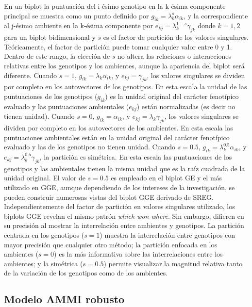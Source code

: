 En un biplot la puntuación del i-ésimo genotipo en la k-ésima componente principal se muestra como un punto definido por $g_{ik} = \lambda_k^{s} \alpha_{ik}$, y la correspondiente al j-ésimo ambiente en la k-ésima componente por $e_{kj} = \lambda_k^{1-s} \gamma_{jk}$ donde $k=1,2$ para un biplot bidimensional y $s$ es el factor de partición de los valores singulares. Teóricamente, el factor de partición puede tomar cualquier valor entre 0 y 1. Dentro de este rango, la elección de $s$ no altera las relaciones o interacciones relativas entre los genotipos y los ambientes, aunque la apariencia del biplot será diferente. Cuando $s=1$, 
$g_{ik} = \lambda_k \alpha_{ik}$, y $e_{kj} = \gamma_{jk}$, los valores singulares se dividen por completo en los autovectores de los genotipos. En esta escala la unidad de las puntuaciones de los genotipos ($g_{ik}$) es la unidad original del carácter fenotípico evaluado y las puntuaciones ambientales ($e_{kj}$) están normalizadas (es decir no tienen unidad). Cuando $s=0$, $g_{ik} = \alpha_{ik}$, y $e_{kj} = \lambda_k \gamma_{jk}$, los valores singulares se dividen por completo en los autovectores de los ambientes. En esta escala las puntuaciones ambientales están en la unidad original del carácter fenotípico evaluado y las de los genotipos no tienen unidad. Cuando $s=0.5$, $g_{ik} = \lambda_k^{0.5} \alpha_{ik}$, y $e_{kj} = \lambda_k^{0.5} \gamma_{jk}$, la partición es simétrica. En esta escala las puntuaciones de los genotipos y las ambientales tienen la misma unidad que es la raíz cuadrada de la unidad original. El valor de $s=0.5$ es empleado en el biplot GE y el más utilizado en GGE, aunque dependiendo de los intereses de la investigación, se pueden construir numerosas vistas del biplot GGE derivado de SREG. Independientemente del factor de partición en valores singulares utilizado, los biplots GGE revelan el mismo patrón \emph{which-won-where}. Sin embargo, difieren en su precisión al mostrar la interrelación entre ambientes y genotipos. La partición centrada en los genotipos ($s=1$) muestra la interrelación entre genotipos con mayor precisión que cualquier otro método; la partición enfocada en los ambientes ($s=0$) es la más informativa sobre las interrelaciones entre los ambientes; y la simétrica ($s=0.5$) permite visualizar la magnitud relativa tanto de la variación de los genotipos como de los ambientes. 




\subsection{Modelo AMMI robusto}

